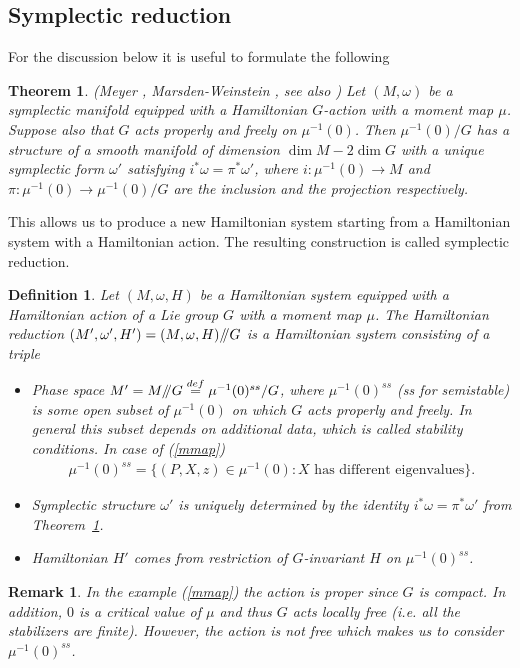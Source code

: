 \documentclass[12pt]{article}
\newtheorem{defn}{Definition}[section]
\newtheorem{rem}{Remark}[section]
\newtheorem{thm}{Theorem}[section]
\numberwithin{equation}{section}
\theoremstyle{definition}
\begin{document}
\subsection{Symplectic reduction}
For the discussion below it is useful to formulate the following
\begin{thm}\label{th:MMW}
    (Meyer \cite{Meyer1973}, Marsden-Weinstein \cite{MARSDEN1974121}, see also \cite{woodward2011}) Let $(M, \omega)$ be a symplectic manifold equipped with a Hamiltonian $G$-action with a moment map $\mu$. Suppose also that $G$ acts properly and freely on $\mu^{-1}(0)$. Then $\mu^{-1}(0)/G$ has a structure of a smooth manifold of dimension $\dim M - 2\dim G$ with a unique symplectic form $\omega'$ satisfying $i^{*}\omega = \pi^{*}\omega'$, where
    $i: \mu^{-1}(0) \rightarrow M$ and $\pi: \mu^{-1}(0) \rightarrow \mu^{-1}(0)/G$ are the inclusion and the projection respectively.
\end{thm}
This allows us to produce a new Hamiltonian system starting from a Hamiltonian system with a Hamiltonian action. The resulting construction is called symplectic reduction.
\begin{defn}\normalfont
    Let $(M, \omega, H)$ be a Hamiltonian system equipped with a Hamiltonian action of a Lie group $G$ with a moment map $\mu$. The Hamiltonian reduction $(M', \omega', H') = (M, \omega, H) /\mkern-5mu/ G$ is a Hamiltonian system consisting of a triple
    \begin{itemize}[label=\raisebox{0.25ex}{\tiny$\bullet$}]
    \item 
    Phase space $M' = M /\mkern-5mu/ G \stackrel{def}{=} \mu^{-1}(0)^{ss} / G$, where $\mu^{-1}(0)^{ss}$ (ss for semistable) is some open subset of $\mu^{-1}(0)$ on which $G$ acts properly and freely. In general this subset depends on additional data, which is called stability conditions. In case of (\ref{mmap})  
    \begin{align*}
        \mu^{-1}(0)^{ss} = \big\{ (P, X, z) \in \mu^{-1}(0): X \text{ has different eigenvalues}\big\}.
    \end{align*}
    \item 
    Symplectic structure $\omega'$ is uniquely determined by the identity $i^{*}\omega = \pi^{*}\omega'$ from Theorem~\ref{th:MMW}.
    \item 
    Hamiltonian $H'$ comes from restriction of $G$-invariant $H$ on $\mu^{-1}(0)^{ss}$.
\end{itemize}
\end{defn}
\begin{rem}
    In the example (\ref{mmap}) the action is proper since $G$ is compact. In addition, $0$ is a critical value of $\mu$ and thus $G$ acts locally free (i.e. all the stabilizers are finite). However, the action is not free which makes us to consider $\mu^{-1}(0)^{ss}$.
\end{rem}
\end{document}
